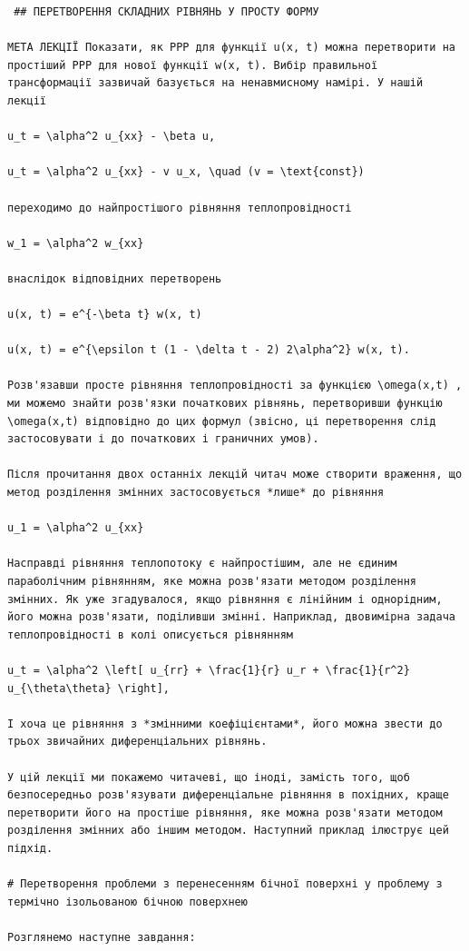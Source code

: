 \documentclass[
  ukrainian,
]{article}
\begin{document}
\begin{verbatim}
 ## ПЕРЕТВОРЕННЯ СКЛАДНИХ РІВНЯНЬ У ПРОСТУ ФОРМУ

МЕТА ЛЕКЦІЇ Показати, як PPP для функції u(x, t) можна перетворити на простіший PPP для нової функції w(x, t). Вибір правильної трансформації зазвичай базується на ненавмисному намірі. У нашій лекції

u_t = \alpha^2 u_{xx} - \beta u,

u_t = \alpha^2 u_{xx} - v u_x, \quad (v = \text{const})

переходимо до найпростішого рівняння теплопровідності

w_1 = \alpha^2 w_{xx}

внаслідок відповідних перетворень

u(x, t) = e^{-\beta t} w(x, t)

u(x, t) = e^{\epsilon t (1 - \delta t - 2) 2\alpha^2} w(x, t).

Розв'язавши просте рівняння теплопровідності за функцією \omega(x,t) , ми можемо знайти розв'язки початкових рівнянь, перетворивши функцію \omega(x,t) відповідно до цих формул (звісно, ці перетворення слід застосовувати і до початкових і граничних умов).

Після прочитання двох останніх лекцій читач може створити враження, що метод розділення змінних застосовується *лише* до рівняння

u_1 = \alpha^2 u_{xx}

Насправді рівняння теплопотоку є найпростішим, але не єдиним параболічним рівнянням, яке можна розв'язати методом розділення змінних. Як уже згадувалося, якщо рівняння є лінійним і однорідним, його можна розв'язати, поділивши змінні. Наприклад, двовимірна задача теплопровідності в колі описується рівнянням

u_t = \alpha^2 \left[ u_{rr} + \frac{1}{r} u_r + \frac{1}{r^2} u_{\theta\theta} \right],

І хоча це рівняння з *змінними коефіцієнтами*, його можна звести до трьох звичайних диференціальних рівнянь.

У цій лекції ми покажемо читачеві, що іноді, замість того, щоб безпосередньо розв'язувати диференціальне рівняння в похідних, краще перетворити його на простіше рівняння, яке можна розв'язати методом розділення змінних або іншим методом. Наступний приклад ілюструє цей підхід.

# Перетворення проблеми з перенесенням бічної поверхні у проблему з термічно ізольованою бічною поверхнею

Розглянемо наступне завдання:


\end{verbatim}
\end{document}

